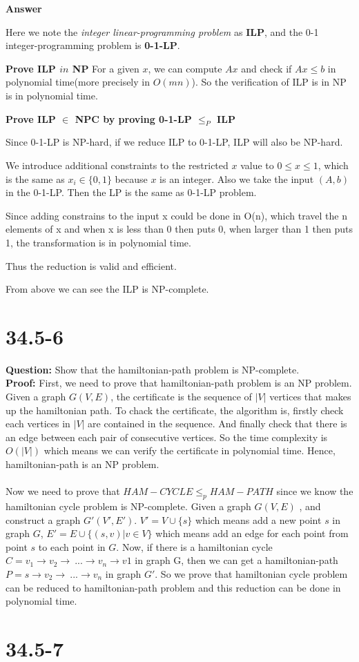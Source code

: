 \documentclass[12pt]{article}
\begin{document}
\textbf{Answer}

Here we note the \textit{integer linear-programming problem} as \textbf{ILP}, and the 0-1 integer-programming problem is \textbf{0-1-LP}.



\textbf{Prove ILP $in$ NP}
For a given $x$, we can compute $Ax$ and check if $Ax \leq b$ in polynomial time(more precisely in $O(mn)$). So the verification of ILP is in NP is in polynomial time.

\textbf{Prove ILP $\in$ NPC by proving 0-1-LP $\leq_{P}$ ILP}

Since 0-1-LP is NP-hard, if we reduce ILP to 0-1-LP, ILP will also be NP-hard. 

We introduce additional constraints to the restricted $x$ value to $0 \leq x \leq 1$, which is the same as $x_i \in \{0,1\}$ because $x$ is an integer. Also we take the input $(A,b)$ in the 0-1-LP. Then the LP is the same as 0-1-LP problem.

Since adding constrains to the input x could be done in O(n), which travel the n elements of x and when x is less than 0 then puts 0, when larger than 1 then puts 1, the transformation is in polynomial time.

Thus the reduction is valid and efficient.

From above we can see the ILP is NP-complete.

\section{34.5-6}
\textbf{Question: }Show that the hamiltonian-path problem is NP-complete.\\
\textbf{Proof: } First, we need to prove that hamiltonian-path problem is an NP problem.
Given a graph \(G(V,E)\), the certificate is the sequence of \(|V|\) vertices that makes up the hamiltonian path. To chack the certificate, the algorithm is, firstly check each vertices in \(|V|\) are contained in the sequence. And finally check that there is an edge between each pair of consecutive vertices. So the time complexity is \(O(|V|)\) which means we can verify the certificate in polynomial time. Hence, hamiltonian-path is an NP problem.
\\
\\
Now we need to prove that \(HAM-CYCLE \leq_p HAM-PATH\) since we know the hamiltonian cycle problem is NP-complete. Given a graph \(G(V,E)\) , and construct a graph \(G'(V',E')\). \(V'= V\cup\{s\}\) which means add a new point \(s\) in graph \(G\), \(E' = E \cup\{(s,v)| v\in V\}\) which means add an edge for each point from point \(s\) to each point in \(G\). 
Now, if there is a hamiltonian cycle \(C=v_1\rightarrow v_2\rightarrow\ ... \rightarrow v_n\rightarrow v1\) in graph G, then we can get a hamiltonian-path \(P= s\rightarrow v_2\rightarrow\ ... \rightarrow v_n\) in graph \(G'\). So we prove that hamiltonian cycle problem can be reduced to hamiltonian-path problem and this reduction can be done in polynomial time.



\section{34.5-7}
\end{document}
